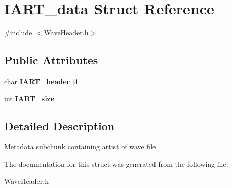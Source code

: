 \hypertarget{structIART__data}{}\section{I\+A\+R\+T\+\_\+data Struct Reference}
\label{structIART__data}


{\ttfamily \#include $<$Wave\+Header.\+h$>$}

\subsection*{Public Attributes}
\begin{DoxyCompactItemize}
\item 
\mbox{\label{structIART__data_a9a8b4afc743d89adf01cd51330116486}} 
char {\bfseries I\+A\+R\+T\+\_\+header} \mbox{[}4\mbox{]}
\item 
\mbox{\label{structIART__data_a070e0fce3197462351bcf3031863bdb3}} 
int {\bfseries I\+A\+R\+T\+\_\+size}
\end{DoxyCompactItemize}


\subsection{Detailed Description}
Metadata subchunk containing artist of wave file 

The documentation for this struct was generated from the following file\+:\begin{DoxyCompactItemize}
\item 
Wave\+Header.\+h\end{DoxyCompactItemize}
